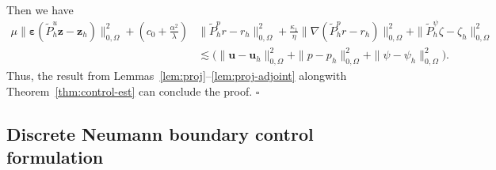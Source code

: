 \documentclass[smallextended]{svjour3}
\renewenvironment{proof}{\noindent{\it Proof.}}{\hfill$\square$}
\numberwithin{equation}{section}
\numberwithin{figure}{section}
\numberwithin{table}{section}
\newcommand\beps{\boldsymbol{\varepsilon}}
\newcommand{\tP}{\tilde{P}}
\newcommand\bu{\boldsymbol{u}}
\newcommand\bz{\boldsymbol{z}}
\begin{document}
\begin{proof}
\begin{align*}
		\end{align*}
		Then we have
		\begin{align*}
			\mu \| \beps( \tP_h^u \bz - \bz_h) \|_{0, \Omega}^2  + \left(c_0 + \frac{\alpha^2}{\lambda} \right) &\| \tP_h^p r - r_h \|_{0, \Omega}^2   + \frac{\kappa_1}{\eta} \| \nabla (\tP_h^p r - r_h)\|_{0, \Omega}^2 + \|\tP_h^\psi \zeta - \zeta_h\|_{0, \Omega}^2   \\
			& \lesssim \big( \| \bu - \bu_h\|_{0, \Omega}^2  + \| p - p_h\|_{0, \Omega}^2 + \| \psi - \psi_h\|_{0, \Omega}^2\big).
		\end{align*}
		Thus, the result from Lemmas~\ref{lem:proj}--\ref{lem:proj-adjoint} alongwith Theorem~\ref{thm:control-est} can conclude the proof.
	\end{proof}

\subsection{Discrete Neumann boundary control formulation}
%	
\end{document}
